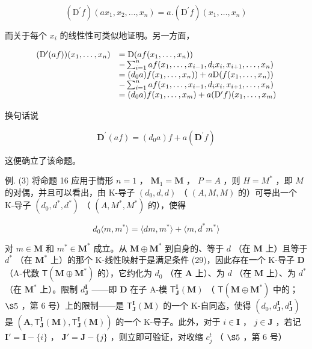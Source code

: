 \[
(\mathrm{D} ^ {\prime} f) (a x _ {1}, x _ {2}, \dots , x _ {n}) = a. (\mathrm{D} ^ {\prime} f) (x _ {1}, \dots , x _ {n})
\]

而关于每个 \(x_{i}\) 的线性性可类似地证明。另一方面，

\[
\begin{array}{r l} (\mathrm{D} ^ {\prime} (a f)) (x _ {1}, \dots , x _ {n}) & = \mathrm{D} (a f (x _ {1}, \dots , x _ {n})) \\ & - \sum_ {i = 1} ^ {n} a f (x _ {1}, \dots , x _ {i - 1}, d _ {i} x _ {i}, x _ {i + 1}, \dots , x _ {n}) \\ & = (d _ {0} a) f (x _ {1}, \dots , x _ {n})) + a \mathrm{D} (f (x _ {1}, \dots , x _ {n})) \\ & - \sum_ {i = 1} ^ {n} a f (x _ {1}, \dots , x _ {i - 1}, d _ {i} x _ {i}, x _ {i + 1}, \dots , x _ {n}) \\ & = (d _ {0} a) f (x _ {1}, \dots , x _ {m}) + a (\mathrm{D} ^ {\prime} f) (x _ {1}, \dots , x _ {m}) \end{array}
\]

换句话说

\[
\mathbf {D} ^ {\prime} (a f) = \left(d _ {0} a\right) f + a (\mathbf {D} ^ {\prime} f)
\]

这便确立了该命题。

例. (3) 将命题 16 应用于情形 \(n = 1\) ， \(\mathbf{M}_1 = \mathbf{M}\) ， \(P = A\) ，则 \(H = M^*\) ，即 \(M\) 的对偶，并且可以看出，由 K-导子 \((d_0, d, d)\) （ \((A, M, M)\) 的）可导出一个 K-导子 \((d_0, d^*, d^*)\) （ \((A, M^*, M^*)\) 的），使得

\[
d _ {0} \langle m, m ^ {*} \rangle = \langle d m, m ^ {*} \rangle + \langle m, d ^ {*} m ^ {*} \rangle\tag{38}
\]

对 \(m \in \mathbf{M}\) 和 \(m^* \in \mathbf{M}^*\) 成立。从 \(\mathbf{M} \oplus \mathbf{M}^*\) 到自身的、等于 \(d\) （在 \(\mathbf{M}\) 上）且等于 \(d^{*}\) （在 \(\mathbf{M}^{*}\) 上）的那个 K-线性映射于是满足条件 (29)，因此存在一个 K-导子 \(\mathbf{D}\) （A-代数 \(\mathsf{T}(\mathbf{M} \oplus \mathbf{M}^{*})\) 的），它约化为 \(d_{0}\) （在 \(\mathbf{A}\) 上）、为 \(d\) （在 \(\mathbf{M}\) 上）、为 \(d^{*}\) （在 \(\mathbf{M}^{*}\) 上）。限制 \(d_{\mathbf{J}}^{\mathbf{I}}\) ——即 \(\mathbf{D}\) 在子 A-模 \(\mathsf{T}_{\mathbf{J}}^{\mathbf{I}}(\mathbf{M})\) （ \(\mathsf{T}(\mathbf{M} \oplus \mathbf{M}^{*})\) 中的； \(\S 5\) ，第 6 号）上的限制——是 \(\mathsf{T}_{\mathbf{J}}^{\mathbf{I}}(\mathbf{M})\) 的一个 K-自同态，使得 \((d_{0}, d_{\mathbf{J}}^{\mathbf{I}}, d_{\mathbf{J}}^{\mathbf{I}})\) 是 \((\mathbf{A}, \mathsf{T}_{\mathbf{J}}^{\mathbf{I}}(\mathbf{M}), \mathsf{T}_{\mathbf{J}}^{\mathbf{I}}(\mathbf{M}))\) 的一个 K-导子。此外，对于 \(i \in \mathbf{I}\) ， \(j \in \mathbf{J}\) ，若记 \(\mathbf{I}' = \mathbf{I} - \{i\}\) ， \(\mathbf{J}' = \mathbf{J} - \{j\}\) ，则立即可验证，对收缩 \(c_{j}^{t}\) （ \(\S 5\) ，第 6 号）


